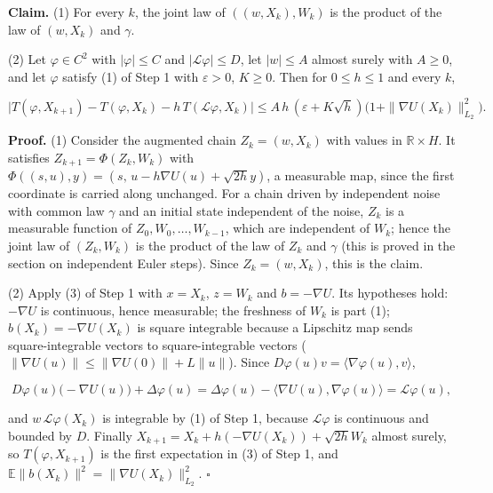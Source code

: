 \documentclass[11pt,a4paper]{report}
\begin{document}
\textbf{Claim.} (1) For every \(k\), the joint law of \(((w,X_k),W_k)\) is the product of the law of \((w,X_k)\) and \(\gamma\).




(2) Let \(\varphi\in C^2\) with \(|\varphi|\le C\) and \(|\mathcal L\varphi|\le D\), let \(|w|\le A\) almost surely with \(A\ge0\), and let \(\varphi\) satisfy (1) of Step 1 with \(\varepsilon>0\), \(K\ge0\). Then for \(0\le h\le1\) and every \(k\),


\[\bigl|T(\varphi,X_{k+1})-T(\varphi,X_k)-h\,T(\mathcal L\varphi,X_k)\bigr|\le A\,h\,(\varepsilon+K\sqrt h)\bigl(1+\|\nabla U(X_k)\|_{L_2}^2\bigr).\]


\textbf{Proof.} (1) Consider the augmented chain \(Z_k=(w,X_k)\) with values in \(\mathbb R\times H\). It satisfies \(Z_{k+1}=\Phi(Z_k,W_k)\) with \(\Phi((s,u),y)=(s,\,u-h\nabla U(u)+\sqrt{2h}y)\), a measurable map, since the first coordinate is carried along unchanged. For a chain driven by independent noise with common law \(\gamma\) and an initial state independent of the noise, \(Z_k\) is a measurable function of \(Z_0,W_0,\dots,W_{k-1}\), which are independent of \(W_k\); hence the joint law of \((Z_k,W_k)\) is the product of the law of \(Z_k\) and \(\gamma\) (this is proved in the section on independent Euler steps). Since \(Z_k=(w,X_k)\), this is the claim.




(2) Apply (3) of Step 1 with \(x=X_k\), \(z=W_k\) and \(b=-\nabla U\). Its hypotheses hold: \(-\nabla U\) is continuous, hence measurable; the freshness of \(W_k\) is part (1); \(b(X_k)=-\nabla U(X_k)\) is square integrable because a Lipschitz map sends square-integrable vectors to square-integrable vectors (\(\|\nabla U(u)\|\le\|\nabla U(0)\|+L\|u\|\)). Since \(D\varphi(u)v=\langle\nabla\varphi(u),v\rangle\),


\[D\varphi(u)\bigl(-\nabla U(u)\bigr)+\Delta\varphi(u)=\Delta\varphi(u)-\langle\nabla U(u),\nabla\varphi(u)\rangle=\mathcal L\varphi(u),\]


and \(w\,\mathcal L\varphi(X_k)\) is integrable by (1) of Step 1, because \(\mathcal L\varphi\) is continuous and bounded by \(D\). Finally \(X_{k+1}=X_k+h(-\nabla U(X_k))+\sqrt{2h}W_k\) almost surely, so \(T(\varphi,X_{k+1})\) is the first expectation in (3) of Step 1, and \(\mathbb E\|b(X_k)\|^2=\|\nabla U(X_k)\|_{L_2}^2\). \(\square\)
\end{document}
